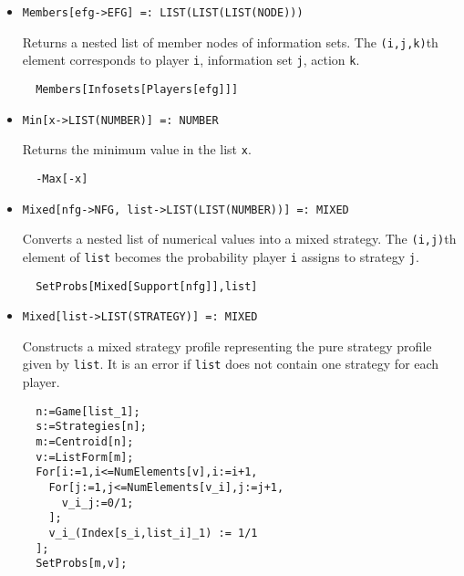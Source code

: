\begin{itemize}
\item{}
\protect \large \begin{verbatim}
Members[efg->EFG] =: LIST(LIST(LIST(NODE))) 
\end{verbatim}\normalsize

\bd 
Returns a nested list of member nodes of information sets.  The
\verb+(i,j,k)+th element corresponds to player \verb+i+, information
set \verb+j+, action \verb+k+.  
\begin{verbatim}
  Members[Infosets[Players[efg]]]
\end{verbatim} 
\ed

\item{}
\protect \large \begin{verbatim}
Min[x->LIST(NUMBER)] =: NUMBER 
\end{verbatim}\normalsize

\bd 
Returns the minimum value in the list \verb+x+.  
\begin{verbatim}
  -Max[-x]
\end{verbatim} 
\ed

\item{}
\protect \large \begin{verbatim}
Mixed[nfg->NFG, list->LIST(LIST(NUMBER))] =: MIXED 
\end{verbatim}\normalsize

\bd 
Converts a nested list of numerical values into a mixed strategy.  The
\verb+(i,j)+th element of \verb+list+ becomes the probability
player \verb+i+ assigns to strategy \verb+j+. 
\begin{verbatim}
  SetProbs[Mixed[Support[nfg]],list]
\end{verbatim} 
\ed

\item{}
\protect \large \begin{verbatim}
Mixed[list->LIST(STRATEGY)] =: MIXED 
\end{verbatim}\normalsize

\bd 
Constructs a mixed strategy profile representing the pure strategy
profile given by \verb+list+. It is an error if \verb+list+ does not
contain one strategy for each player.
\begin{verbatim}
  n:=Game[list_1];
  s:=Strategies[n];
  m:=Centroid[n];
  v:=ListForm[m];
  For[i:=1,i<=NumElements[v],i:=i+1,
    For[j:=1,j<=NumElements[v_i],j:=j+1,
      v_i_j:=0/1;
    ];
    v_i_(Index[s_i,list_i]_1) := 1/1
  ];
  SetProbs[m,v];   
\end{verbatim} 
\ed



\end{itemize}
